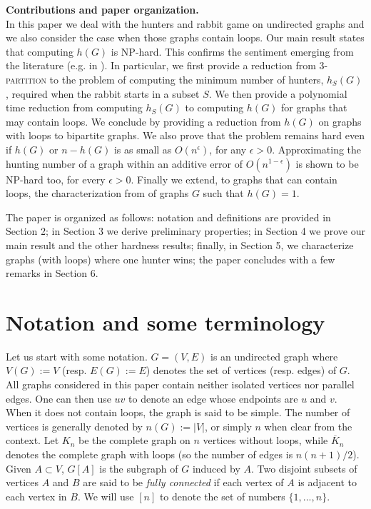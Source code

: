 \documentclass[runningheads]{llncs}
\begin{document}
\smallskip
\noindent\textbf{Contributions and paper organization.} \\
In this paper we deal with the hunters and rabbit game on undirected graphs and we also consider the case when those graphs contain loops. Our main result states that computing $h(G)$ is NP-hard. This confirms the sentiment emerging from the literature (e.g. in \cite{ABRAMOVSKAYA201612,dissaux:hal-03995642}). {In particular, we first provide a reduction from \textsc{3-partition} to {the problem of computing the minimum number of hunters, $h_S(G)$, required when the rabbit starts in a subset $S$}. We then provide a polynomial time reduction from computing $h_S(G)$ to computing $h(G)$ for graphs that may contain loops. We conclude by providing a reduction from $h(G)$ on graphs with loops to bipartite graphs.} We also prove that the problem remains hard even if $h(G)$ or $n-h(G)$ is as small as $O(n^{\epsilon})$, for any $\epsilon>0$. Approximating the hunting number of a graph within an additive error of $O(n^{1-\epsilon})$ is shown to be NP-hard too, for every $\epsilon >0$. Finally we extend, to graphs that can contain loops, the characterization from 
\cite{journals/combinatorics/BritnellW13,HASLEGRAVE20141}
of graphs $G$ such that $h(G)=1$.

The paper is organized as follows: notation and definitions are provided  in Section 2; in Section 3 we derive preliminary properties; in Section 4 we prove our main result and the other hardness results; finally, in Section 5, we characterize graphs (with loops) where one hunter wins; {the paper concludes with a few remarks in Section 6.}

\section{Notation and some terminology}
\label{sec:nota}
Let us start with some notation. $G=(V,E)$ is an undirected graph where $V(G):= V$ (resp. $E(G):=E$) denotes the set of vertices (resp. edges) of $G$. 
All graphs considered in this paper contain neither {isolated vertices} nor parallel edges.  One can then use $uv$ to denote an edge whose endpoints are $u$ and $v$. When it does not contain loops, the graph is said to be simple.
The number of vertices is generally denoted by $n(G):=|V|$, or simply $n$  when clear from the context.
Let $K_n$ be the complete graph on $n$ vertices without loops, while $\overline{K}_n$ denotes the complete graph with loops (so the number of edges is $n(n+1)/2$).
Given $A \subset V$, $G[A]$ is the subgraph of $G$ induced by $A$. Two disjoint subsets of vertices $A$ and $B$ are said to be \emph{fully connected} if each vertex of $A$ is adjacent to each vertex in $B$. 
We will use $[n]$ to denote the set of numbers $\{1,...,n \}$.
\end{document}
